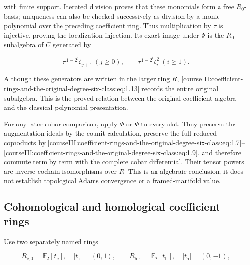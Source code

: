 with finite support. Iterated division proves that these monomials form a free \(R_0\)-basis; uniqueness can also be checked successively as division by a monic polynomial over the preceding coefficient ring. Thus multiplication by \(\tau\) is injective, proving the localization injection. Its exact image under \(\Psi\) is the \(R_0\)-subalgebra of \(C\) generated by

\begin{equation}
\tau^{\,1-2^j}\zeta_{j+1}\ (j\geq0),\qquad
 \tau^{\,1-2^i}\zeta_i^2\ (i\geq1).
 \label{courseIII:coefficient-rings-and-the-original-degree-six-class:eq:1.13}
\end{equation}

Although these generators are written in the larger ring \(R\), \eqref{courseIII:coefficient-rings-and-the-original-degree-six-class:eq:1.13} records the entire original subalgebra. This is the proved relation between the original coefficient algebra and the classical polynomial presentation.

For any later cobar comparison, apply \(\Phi\) or \(\Psi\) to every slot. They preserve the augmentation ideals by the counit calculation, preserve the full reduced coproducts by \eqref{courseIII:coefficient-rings-and-the-original-degree-six-class:eq:1.7}--\eqref{courseIII:coefficient-rings-and-the-original-degree-six-class:eq:1.9}, and therefore commute term by term with the complete cobar differential. Their tensor powers are inverse cochain isomorphisms over \(R\). This is an algebraic conclusion; it does not establish topological Adams convergence or a framed-manifold value.

\label{courseIII:coefficient-rings-and-the-original-degree-six-class:coefficient-two-gradings}

\subsection{Cohomological and homological coefficient rings}
\label{courseIII:coefficient-rings-and-the-original-degree-six-class:section-2}

\label{courseIII:coefficient-rings:2}

Use two separately named rings

\begin{equation}
R_{\mathrm c,0}=\mathbb F_2[t_{\mathrm c}],
 \quad |t_{\mathrm c}|=(0,1),
 \qquad
 R_{\mathrm h,0}=\mathbb F_2[t_{\mathrm h}],
 \quad |t_{\mathrm h}|=(0,-1),
 \label{courseIII:coefficient-rings-and-the-original-degree-six-class:eq:2.1}
\end{equation}

